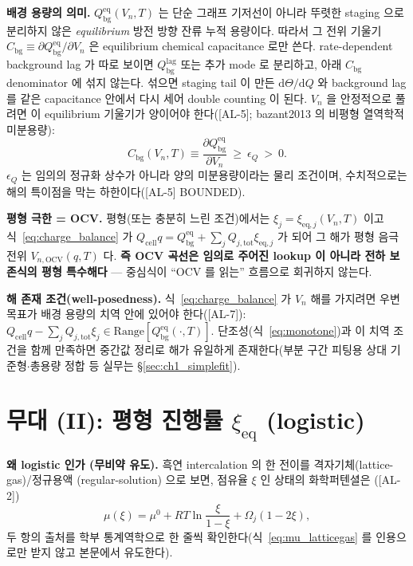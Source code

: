 \documentclass[11pt,a4paper]{article}
\newcommand{\dd}{\mathrm{d}}
\newcommand{\eq}{\mathrm{eq}}
\newcommand{\bg}{\mathrm{bg}}
\newcommand{\cell}{\mathrm{cell}}
\newcommand{\OCV}{\mathrm{OCV}}
\newcommand{\tot}{\mathrm{tot}}
\newcommand{\AL}[1]{\textsf{[AL-#1]}}
\begin{document}
\textbf{배경 용량의 의미.} $Q_\bg^{\eq}(V_n,T)$ 는 단순 그래프 기저선이 아니라 뚜렷한 staging 으로 분리하지 않은
\emph{equilibrium} 방전 방향 잔류 누적 용량이다. 따라서 그 전위 기울기
$C_\bg\equiv\partial Q_\bg^{\eq}/\partial V_n$ 은 equilibrium chemical capacitance 로만 쓴다. rate-dependent
background lag 가 따로 보이면 $Q_\bg^{\mathrm{lag}}$ 또는 추가 mode 로 분리하고, 아래 $C_\bg$ denominator 에 섞지 않는다.
섞으면 staging tail 이 만든 $\dd\Theta/\dd Q$ 와 background lag 를 같은 capacitance 안에서 다시 세어 double counting 이 된다.
$V_n$ 을 안정적으로 풀려면 이 equilibrium 기울기가 양이어야 한다(\AL{5}; bazant2013 의 비평형 열역학적 미분용량):
\begin{equation}
C_\bg(V_n,T)\equiv\frac{\partial Q_\bg^{\eq}}{\partial V_n}\ \ge\ \epsilon_Q\ >\ 0 .
\label{eq:monotone}
\end{equation}
$\epsilon_Q$ 는 임의의 정규화 상수가 아니라 양의 미분용량이라는 물리 조건이며, 수치적으로는 해의 특이점을
막는 하한이다(\AL{5} BOUNDED).

\textbf{평형 극한 = OCV.} 평형(또는 충분히 느린 조건)에서는 $\xi_j=\xi_{\eq,j}(V_n,T)$ 이고
식~\eqref{eq:charge_balance} 가 $Q_\cell q=Q_\bg^{\eq}+\sum_j Q_{j,\tot}\xi_{\eq,j}$ 가 되어 그 해가 평형 음극
전위 $V_{n,\OCV}(q,T)$ 다. \textbf{즉 OCV 곡선은 임의로 주어진 lookup 이 아니라 전하 보존식의 평형
특수해다} — 중심식이 ``OCV 를 읽는'' 흐름으로 회귀하지 않는다.

\textbf{해 존재 조건(well-posedness).} 식~\eqref{eq:charge_balance} 가 $V_n$ 해를 가지려면 우변 목표가 배경
용량의 치역 안에 있어야 한다(\AL{7}): $Q_\cell q-\sum_j Q_{j,\tot}\xi_j\in\mathrm{Range}[Q_\bg^{\eq}(\cdot,T)]$.
단조성(식~\eqref{eq:monotone})과 이 치역 조건을 함께 만족하면 중간값 정리로 해가 유일하게 존재한다(부분
구간 피팅용 상대 기준형$\cdot$총용량 정합 등 실무는 \S\ref{sec:ch1_simplefit}).

\section{무대 (II): 평형 진행률 $\xi_\eq$ (logistic)}\label{sec:eq}
\textbf{왜 logistic 인가 (무비약 유도).} 흑연 intercalation 의 한 전이를 격자기체(lattice-gas)/정규용액
(regular-solution) 으로 보면, 점유율 $\xi$ 인 상태의 화학퍼텐셜은 \cite{mckinnon1983,bazant2013}(\AL{2})
\begin{equation}
\mu(\xi)=\mu^0+RT\ln\frac{\xi}{1-\xi}+\Omega_j(1-2\xi),
\label{eq:mu_latticegas}
\end{equation}
두 항의 출처를 학부 통계역학으로 한 줄씩 확인한다(식~\eqref{eq:mu_latticegas} 를 인용으로만 받지 않고 본문에서 유도한다).
\end{document}
